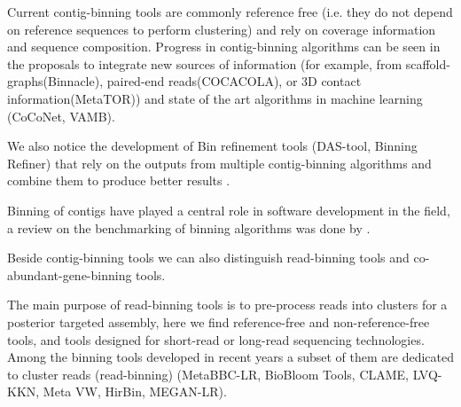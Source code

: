 \documentclass{article}
\begin{document}
Current contig-binning tools are commonly reference free (i.e. they do not depend on reference sequences to perform clustering) and rely on coverage information and sequence composition.
Progress in contig-binning algorithms can be seen in the proposals to integrate new sources of information (for example, from scaffold-graphs(Binnacle), paired-end reads(COCACOLA), or 3D contact information(MetaTOR)) and state of the art algorithms in machine learning (CoCoNet, \gls{VAMB}).

We also notice the development of Bin refinement tools (DAS-tool, Binning Refiner) that rely on the outputs from multiple contig-binning algorithms and combine them to produce better results \cite{sieber2018recovery}.

Binning of contigs have played a central role in software development in the field, a review on the benchmarking of binning algorithms was done by . 

Beside contig-binning tools we can also distinguish read-binning tools and co-abundant-gene-binning tools.

The main purpose of read-binning tools is to pre-process reads into clusters for a posterior targeted assembly, here we find reference-free and non-reference-free tools, and tools designed for short-read or long-read sequencing technologies.
Among the binning tools developed in recent years a subset of them are dedicated to cluster reads (read-binning) (MetaBBC-LR, BioBloom Tools, CLAME, LVQ-KKN, Meta VW, HirBin, MEGAN-LR).
\end{document}
